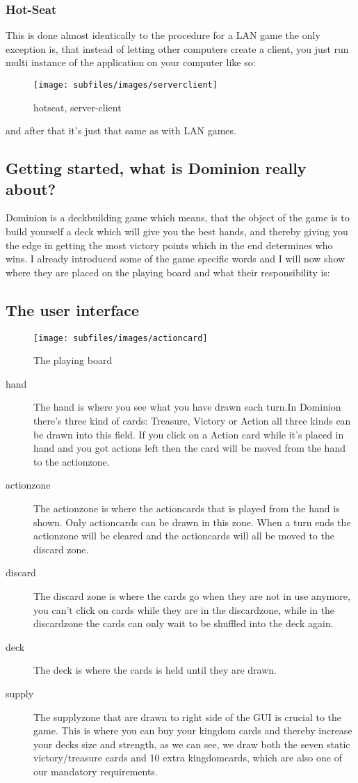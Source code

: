\subsubsection{Hot-Seat}
This is done almost identically to the procedure for a LAN game the only exception is, that instead of letting other computers create a client, you just run multi instance of the application on your computer like so:
\begin{figure}[h!]
\centering
\texttt{[image: subfiles/images/serverclient]}
\caption{hotseat, server-client}
\end{figure}
and after that it's just that same as with LAN games.


\subsection{Getting started, what is Dominion really about?}
Dominion is a deckbuilding game which means, that the object of the game is to build yourself a deck which will give you the best hands, and thereby giving you the edge in getting the most victory points which in the end determines who wins.
I already introduced some of the game specific words and I will now show where they are placed on the playing board and what their responsibility is:

\subsection{The user interface}

\begin{figure}[h!]
\centering
\texttt{[image: subfiles/images/actioncard]}
\caption{The playing board}
\end{figure}
\begin{description}
\item[hand]The hand is where you see what you have drawn each turn.In Dominion there's three kind of cards: Treasure, Victory or Action all three kinds can be drawn into this field. If you click on a Action card while it's placed in hand and you got actions left then the card will be moved from the hand to the actionzone.
\item[actionzone] The actionzone is where the actioncards that is played from the hand is shown. Only actioncards can be drawn in this zone. When a turn ends the actionzone will be cleared and the actioncards will all be moved to the discard zone.
\item[discard] The discard zone is where the cards go when they are not in use anymore, you can't click on cards while they are in the discardzone, while in the discardzone the cards can only wait to be shuffled into the deck again.
\item[deck] The deck is where the cards is held until they are drawn.
\item [supply] The supplyzone that are drawn to right side of the GUI is crucial to the game. This is where you can buy your kingdom cards and thereby increase your decks size and strength, as we can see, we draw both the seven static victory/treasure cards and 10 extra kingdomcards, which are also one of our mandatory requirements.
\end{description}

